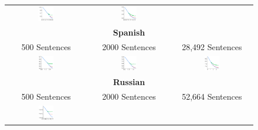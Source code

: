 \documentclass[11pt,letterpaper]{article}
\begin{document}
\begin{figure}
\begin{centering}
\begin{tabular}{ccc}
		\includegraphics[width=0.2\textwidth]{figures/English_2000-listener-surprisal-memory-MEDIANS_onlyWordForms_boundedVocab.pdf} &
\includegraphics[width=0.2\textwidth]{figures/English-listener-surprisal-memory-MEDIANS_onlyWordForms_boundedVocab.pdf}
\\
		\multicolumn{3}{c}{\textbf{Spanish}} \\ 500 Sentences & 2000 Sentences & 28,492 Sentences \\
		\includegraphics[width=0.2\textwidth]{figures/Spanish_500-listener-surprisal-memory-MEDIANS_onlyWordForms_boundedVocab.pdf} &
		\includegraphics[width=0.2\textwidth]{figures/Spanish_2000-listener-surprisal-memory-MEDIANS_onlyWordForms_boundedVocab.pdf} &
\includegraphics[width=0.2\textwidth]{figures/Spanish-listener-surprisal-memory-MEDIANS_onlyWordForms_boundedVocab.pdf}
\\
		\multicolumn{3}{c}{\textbf{Russian}} \\ 500 Sentences & 2000 Sentences & 52,664 Sentences \\
		\includegraphics[width=0.2\textwidth]{figures/Russian_500-listener-surprisal-memory-MEDIANS_onlyWordForms_boundedVocab.pdf} &

\end{tabular}
\end{centering}
\end{figure}
\end{document}
